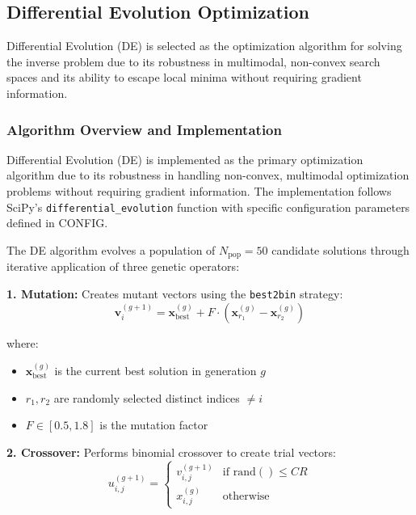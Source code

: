 \documentclass[12pt,a4paper]{report}
\begin{document}
\subsection{Differential Evolution Optimization}

Differential Evolution (DE) is selected as the optimization algorithm for solving the inverse problem due to its robustness in multimodal, non-convex search spaces and its ability to escape local minima without requiring gradient information.

\subsubsection{Algorithm Overview and Implementation}

Differential Evolution (DE) is implemented as the primary optimization algorithm due to its robustness in handling non-convex, multimodal optimization problems without requiring gradient information. The implementation follows SciPy's \texttt{differential\_evolution} function with specific configuration parameters defined in CONFIG.

The DE algorithm evolves a population of $N_{\text{pop}} = 50$ candidate solutions through iterative application of three genetic operators:

\textbf{1. Mutation:} Creates mutant vectors using the \texttt{best2bin} strategy:
\begin{equation}
\mathbf{v}_i^{(g+1)} = \mathbf{x}_{\text{best}}^{(g)} + F \cdot \left( \mathbf{x}_{r_1}^{(g)} - \mathbf{x}_{r_2}^{(g)} \right)
\label{eq:de_mutation}
\end{equation}

where:
\begin{itemize}
    \item $\mathbf{x}_{\text{best}}^{(g)}$ is the current best solution in generation $g$
    \item $r_1, r_2$ are randomly selected distinct indices $\neq i$
    \item $F \in [0.5, 1.8]$ is the mutation factor 
\end{itemize}

\textbf{2. Crossover:} Performs binomial crossover to create trial vectors:
\begin{equation}
u_{i,j}^{(g+1)} = \begin{cases}
v_{i,j}^{(g+1)} & \text{if } \text{rand}() \leq CR \\
x_{i,j}^{(g)} & \text{otherwise}
\end{cases}
\label{eq:de_crossover}
\end{equation}
\end{document}
